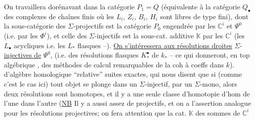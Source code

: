 On travaillera dorénavant dans la catégorie $P_1=Q$ (équivalente à la catégorie $Q_{\bullet}$ des complexes de chaînes finis où les \deleted{\unsure{-}} $L_i$, $Z_i$, $B_i$, $H_i$ sont libres de type fini),  dont la sous-catégorie des $\Sigma$-projectifs est  la catégorie  $P_0$ engendrée par les $\mathbb{C}^i$ et $\Psi^0$ (i.e. par les $\Phi^i$), et celle des $\Sigma$-injectifs est la sous-cat. additive $\mathbb{K}$   par les $\mathbb{C}^i$ (les $L_{\bullet}$  acycliques i.e. les $L_*$ flasques --). \uline{On s'intéressera aux résolutions droites}  $\Sigma$-\uline{injectives de} $\Psi^0$, (i.e. des résolutions flasques $K^{\bullet}_*$ de $k_*$ \unsure{$\simeq$} -- ce qui donneront,  en top algébrique \inserted{\unsure{$\simeq$}}, des méthodes de calcul remarquables de la coh à coeffs dans $k$).  d'algèbre homologique ``relative''  suites exactes, qui nous disent que si (comme c'est le cas ici) tout objet  se plonge dans un $\Sigma$-injectif,  par un $\Sigma$-mono, alors   deux résolutions sont homotopes, et il y a une seule classe d'homotopie d'hom de l'une dans l'autre (\uline{NB} Il y a aussi assez de projectifs, et on a l'assertion analogue pour les résolutions projectives; on fera attention que la cat. $\mathbb{K}$ des sommes de $\mathbb{C}^i$ 
